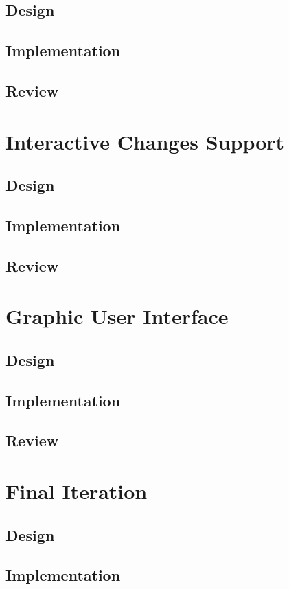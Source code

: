 \subsection{Design}
\subsection{Implementation}
\subsection{Review}

\section{Interactive Changes Support}
\subsection{Design}
\subsection{Implementation}
\subsection{Review}

\section{Graphic User Interface}
\subsection{Design}
\subsection{Implementation}
\subsection{Review}

\section{Final Iteration}
\subsection{Design}
\subsection{Implementation}
